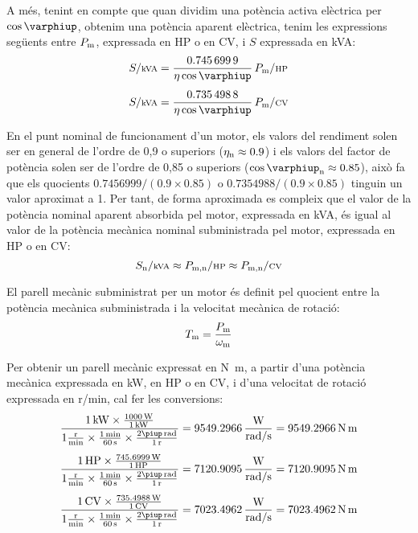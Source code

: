  A més, tenint en compte que quan dividim una potència activa elèctrica per $\cos\varphiup$, obtenim una potència aparent elèctrica, tenim les expressions següents entre $P\ped{m}$, expressada en HP o en CV, i $S$ expressada en kVA:
\begin{align}
    S/{\scriptstyle\si{kVA}} &= \frac{\num{0,7456999}}{\eta \cos\varphiup}\,   P\ped{m}/{\scriptstyle\si{HP}} \\[1ex]
    S/{\scriptstyle\si{kVA}} &= \frac{\num{0,7354988}}{\eta \cos\varphiup}\,   P\ped{m}/{\scriptstyle\si{CV}}
\end{align}

En el punt nominal de funcionament d'un motor, els valors del rendiment solen ser en general de l'ordre de 0,9 o superiors ($\eta\ped{n} \approx \num{0,9}$) i els valors del factor de potència solen ser de l'ordre de 0,85 o superiors ($\cos\varphiup\ped{n} \approx \num{0,85}$), això fa que els quocients $\num{0,7456999}/(\num{0,9} \times \num{0,85})$ o $\num{0,7354988}/(\num{0,9} \times \num{0,85})$ tinguin un valor aproximat a 1. Per tant, de forma aproximada es compleix que el valor de la potència nominal aparent absorbida pel motor, expressada en kVA, és igual al valor de la potència mecànica nominal subministrada pel motor, expressada en HP o en CV:
\begin{equation}\label{eq:kVA-CV-HP}
    S\ped{n}/{\scriptstyle \si{kVA}} \approx  P\ped{m,n}/{\scriptstyle \si{HP}} \approx  P\ped{m,n}/{\scriptstyle \si{CV}}
\end{equation}


El parell mecànic subministrat per un motor és definit pel quocient entre la potència mecànica subministrada i la velocitat mecànica de rotació:
\begin{equation}\index{parell!mecànic}
    T\ped{m} = \frac{P\ped{m}}{\omega\ped{m}}\label{eq:T-P-w}
\end{equation}

Per  obtenir un  parell mecànic expressat en \si{N.m}, a partir d'una potència mecànica expressada en kW, en HP o en CV, i d'una velocitat de rotació expressada en \si{r/min}, cal  fer les conversions:
\begin{subequations}
\begin{align}
    \frac{\SI{1}{kW} \times \frac{\SI{1000}{W}}{\SI{1}{kW}}}{1\frac{\si{r}}{\si{min}} \times \frac{\SI{1}{min}}{\SI{60}{s}} \times \frac{2\piup\,\si{rad}}{\SI{1}{r}}} &=  \num{9549,2966}\, \frac{\si{W}}{\si{rad/s}} = \SI{9549,2966}{N.m} \\[1ex]
    \frac{\SI{1}{HP} \times \frac{\SI{745,6999}{W}}{\SI{1}{HP}}}{1\frac{\si{r}}{\si{min}} \times \frac{\SI{1}{min}}{\SI{60}{s}} \times \frac{2\piup\,\si{rad}}{\SI{1}{r}}} &=  \num{7120,9095}\, \frac{\si{W}}{\si{rad/s}} = \SI{7120,9095}{N.m} \\[1ex]
    \frac{\SI{1}{CV} \times \frac{\SI{735,4988}{W}}{\SI{1}{CV}}}{1\frac{\si{r}}{\si{min}} \times \frac{\SI{1}{min}}{\SI{60}{s}} \times \frac{2\piup\,\si{rad}}{\SI{1}{r}}} &=  \num{7023,4962}\, \frac{\si{W}}{\si{rad/s}} = \SI{7023,4962}{N.m}
\end{align}
\end{subequations}

